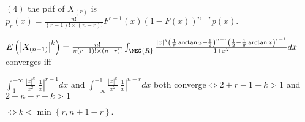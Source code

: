 \documentclass{article}
\begin{document}
$\left( 4\right) $ the pdf of $X_{\left( r\right) }$ is $p_{r}\left(
x\right) =\frac{n!}{\left( r-1\right) !\times \left( n-r\right) !}%
F^{r-1}\left( x\right) \left( 1-F\left( x\right) \right) ^{n-r}p\left(
x\right) .$

$E\left( \left\vert X_{\left( n-1\right) }\right\vert ^{k}\right) =\frac{n!}{%
\pi \left( r-1\right) !\times \left( n-r\right) !}\int_{\NEG{R}}\frac{%
\left\vert x\right\vert ^{k}\left( \frac{1}{\pi }\arctan x+\frac{1}{2}%
\right) ^{n-r}\left( \frac{1}{2}-\frac{1}{\pi }\arctan x\right) ^{r-1}}{%
1+x^{2}}dx$ converges iff 

$\int_{1}^{+\infty }\frac{\left\vert x\right\vert ^{k}}{x^{2}}\left\vert 
\frac{1}{x}\right\vert ^{r-1}dx$ and $\int_{-\infty }^{-1}\frac{\left\vert
x\right\vert ^{k}}{x^{2}}\left\vert \frac{1}{x}\right\vert ^{n-r}dx$ both
converge$\iff 2+r-1-k>1$ and $2+n-r-k>1$

$\iff k<\min \left\{ r,n+1-r\right\} .$ 
\end{document}
